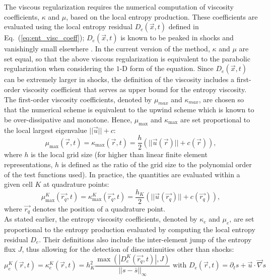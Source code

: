 \documentclass[preprint,10pt]{elsarticle}
\newcommand{\grad}{\vec{\nabla}}
\newcommand{\eqt}[1]{Eq.~(\ref{#1})}                     %
\begin{document}
The viscous regularization requires the numerical computation of viscosity coefficients, $\kappa$ and $\mu$, based on the local entropy production. These coefficients are evaluated using the local entropy residual $D_e(\vec{x},t)$ defined in \eqt{eq:ent_visc_coeff}; $D_e(\vec{x},t)$ is known to be peaked in shocks and vanishingly small elsewhere \cite{Toro}.
%
In the current version of the method, $\kappa$ and $\mu$ are set equal, so that the above viscous regularization is equivalent to the parabolic regularization \cite{Parabolic} when considering the $1$-D form of the equation. Since $D_e(\vec{x},t)$ can be extremely larger in shocks, the definition of the viscosity includes a first-order viscosity coefficient that serves as upper bound for the entropy viscosity. The first-order viscosity coefficients, denoted by $\mu_{max}$ and $\kappa_{max}$, are chosen so that the numerical scheme is equivalent to the upwind scheme which is known to be over-dissipative and monotone\cite{Toro}.  Hence, $\mu_{\max}$ and $\kappa_{\max}$ are set proportional to the local largest eigenvalue $|| \vec{u} || + c $:
%
\begin{equation}
\label{eq:fo}
\mu_{\max}(\vec{r}, t) = \kappa_{\max}(\vec{r}, t) = \frac{h}{2} \left( || \vec{u}(\vec{r}) || + c(\vec{r}) \right),
\end{equation}
%
where $h$ is the local grid size (for higher than linear finite element representations, $h$ is defined as the ratio of the grid size to the polynomial order of the test functions used). In practice, the quantities are evaluated within a given cell $K$ at quadrature points:
%
\begin{equation}
\label{eq:fo_quad}
\mu^K_{\max}(\vec{r_q}, t) = \kappa^K_{\max}(\vec{r_q}, t) = \frac{h_K}{2} \left( || \vec{u}(\vec{r_q}) || + c(\vec{r_q}) \right),
\end{equation}
%
where $\vec{r_q}$ denotes the position of a quadrature point.\\
As stated earlier, the entropy viscosity coefficients, denoted by $\kappa_e$ and $\mu_e$, are set proportional to the entropy production evaluated by computing the local entropy residual $D_e$. Their definitions also include the inter-element jump of the entropy flux $J$, thus allowing for the detection of discontinuities other than shocks:
\begin{equation}
\label{eq:ent_visc_coeff}
\mu^K_e(\vec{r},t) = \kappa^K_e(\vec{r},t) = h_K^2 \frac{\max\left( | D^K_e(\vec{r_q},t) |, J \right)}{|| s - \bar{s} ||_{\infty}} \text{ with } D_e(\vec{r}, t) = \partial_t s + \vec{u} \cdot \grad s
\end{equation}
\end{document}
